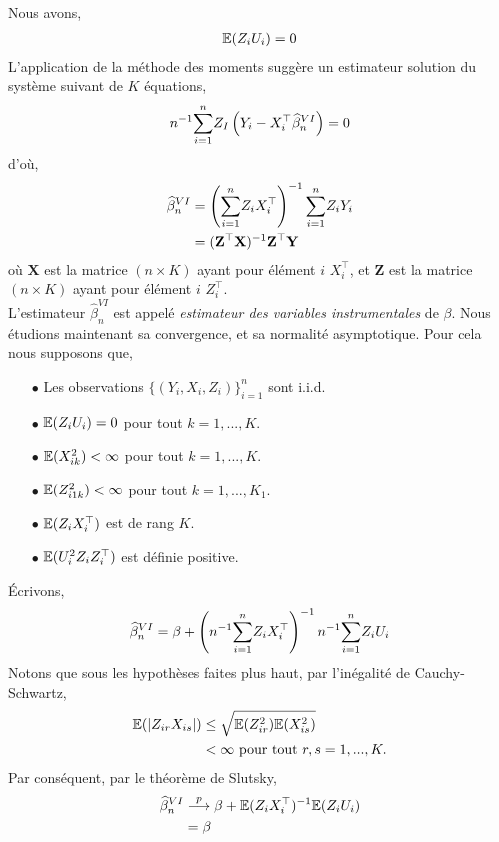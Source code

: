 \documentclass[12pt, reqno]{amsart}
\begin{document}
Nous avons,
\begin{align*}
\mathbb{E}(Z_iU_i) = 0
\end{align*}
L'application de la méthode des moments suggère un estimateur solution du système suivant de $K$ équations,
\begin{align*}
n^{-1}\underset{i=1}{\overset{n}{\sum}} Z_I\left(Y_i-X_i^\top\widehat{\beta}_n^{VI}\right) = 0
\end{align*}
d'où,
\begin{align*}
\widehat{\beta}_n^{VI} &= \left(\underset{i=1}{\overset{n}{\sum}} Z_iX_i^\top\right)^{-1}\underset{i=1}{\overset{n}{\sum}} Z_iY_i\\
&=(\mathbf{Z}^\top\mathbf{X})^{-1}\mathbf{Z}^\top\mathbf{Y}
\end{align*}
où $\mathbf{X}$ est la matrice $(n\times K)$ ayant pour élément $i$ $X_i^\top$, et $\mathbf{Z}$ est la matrice $(n\times K)$ ayant pour élément $i$ $Z_i^\top$.\\
L'estimateur $\widehat{\beta}_n^{VI}$ est appelé \emph{estimateur des variables instrumentales} de $\beta$.
Nous étudions maintenant sa convergence, et sa normalité asymptotique. Pour cela nous supposons que,
\begin{itemize}
\item[$\bullet$] Les observations $\{(Y_i, X_i, Z_i)\}_{i=1}^n$ sont i.i.d.
\item[$\bullet$] $\mathbb{E}(Z_iU_i) = 0$ pour tout $k=1,...,K$.
\item[$\bullet$] $\mathbb{E}(X_{ik}^2) < \infty$ pour tout $k=1,...,K$.
\item[$\bullet$] $\mathbb{E}(Z_{i1k}^2) < \infty$ pour tout $k=1,...,K_1$.
\item[$\bullet$] $\mathbb{E}(Z_iX_i^\top)$ est de rang $K$.
\item[$\bullet$] $\mathbb{E}(U_i^2Z_iZ_i^\top)$ est définie positive.
\end{itemize}
\'Ecrivons,
\begin{align}
\widehat{\beta}_n^{VI} = \beta + \left(n^{-1}\underset{i=1}{\overset{n}{\sum}} Z_iX_i^\top\right)^{-1}n^{-1}\underset{i=1}{\overset{n}{\sum}} Z_iU_i
\label{eq3}
\end{align}
Notons que sous les hypothèses faites plus haut, par l'inégalité de Cauchy-Schwartz,
\begin{align*}
\mathbb{E}(\left\vert {Z_{ir}X_{is}} \right\vert) &\leq \sqrt{\mathbb{E}(Z_{ir}^2)\mathbb{E}(X_{is}^2)}\\
&< \infty \ \textrm{pour tout} \ r, s = 1,...,K.
\end{align*}
Par conséquent, par le théorème de Slutsky,
\begin{align*}
\widehat{\beta}_n^{VI}  &\overset{p}{\longrightarrow} \beta + \mathbb{E}(Z_iX_i^\top)^{-1}\mathbb{E}(Z_iU_i)\\
&= \beta
\end{align*}
\end{document}
